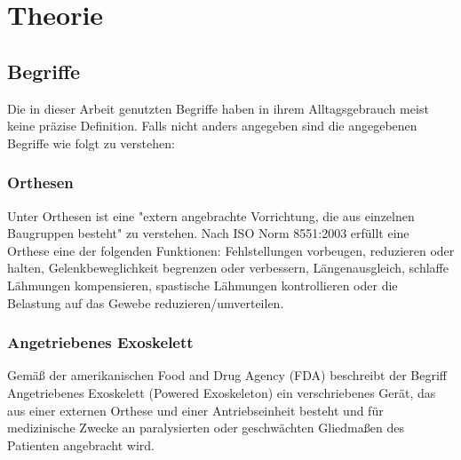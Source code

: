 \part{Theorie}
\chapter{Begriffe}
Die in dieser Arbeit genutzten Begriffe haben in ihrem Alltagsgebrauch meist keine präzise Definition. Falls nicht anders angegeben sind die angegebenen Begriffe wie folgt zu verstehen:\\
\section{Orthesen}
Unter Orthesen ist eine "extern angebrachte Vorrichtung, die aus einzelnen Baugruppen besteht"\citep{Specht.2008} zu verstehen. Nach ISO Norm 8551:2003 erfüllt eine Orthese eine der folgenden Funktionen: Fehlstellungen vorbeugen, reduzieren oder halten, Gelenkbeweglichkeit begrenzen oder verbessern, L\"angenausgleich, schlaffe L\"ahmungen kompensieren, spastische L\"ahmungen kontrollieren oder die Belastung auf das Gewebe reduzieren/umverteilen. \\
\section{Angetriebenes Exoskelett}
Gem\"aß der amerikanischen Food and Drug Agency (FDA) beschreibt der Begriff Angetriebenes Exoskelett (Powered Exoskeleton) ein verschriebenes Ger\"at, das aus einer externen Orthese und einer Antriebseinheit besteht und für medizinische Zwecke an paralysierten oder geschw\"achten Gliedmaßen des Patienten angebracht wird\citep{FoodandDrugAdministration.2016}. 
